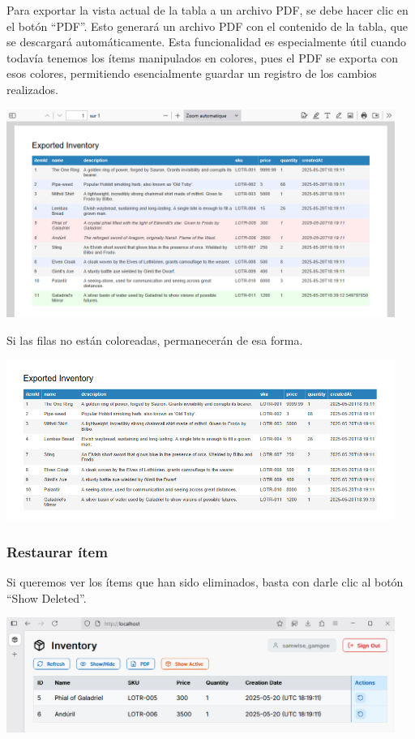 Para exportar la vista actual de la tabla a un archivo PDF, se debe hacer clic en el botón “PDF”. Esto generará un archivo PDF con el contenido de la tabla, que se descargará automáticamente. Esta funcionalidad es especialmente útil cuando todavía tenemos los ítems manipulados en colores, pues el PDF se exporta con esos colores, permitiendo esencialmente guardar un registro de los cambios realizados.

\begin{center}
\includegraphics[width=0.95\textwidth]{images/20 PDF Colores}
\end{center}

Si las filas no están coloreadas, permanecerán de esa forma.

\begin{center}
\includegraphics[width=0.95\textwidth]{images/21 PDF Actualizado}
\end{center}

\subsubsection{Restaurar ítem}

Si queremos ver los ítems que han sido eliminados, basta con darle clic al botón “Show Deleted”.

\begin{center}
\includegraphics[width=0.95\textwidth]{images/22 Eliminados}
\end{center}

